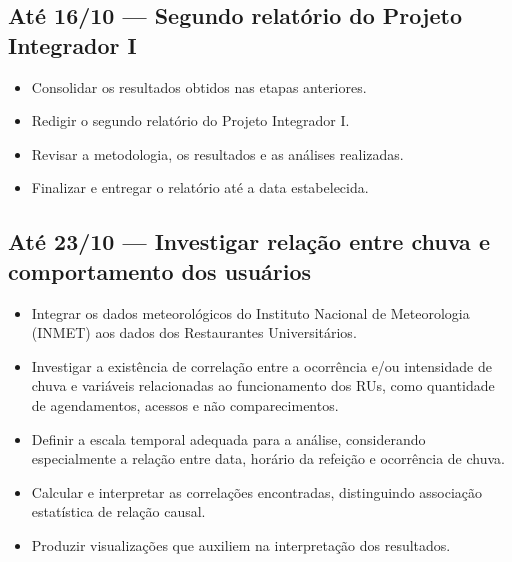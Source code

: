 \documentclass{article}
\begin{document}
\subsection{Até 16/10 --- Segundo relatório do Projeto Integrador I}
\label{ssec:etapa3}

\begin{itemize}
    \item Consolidar os resultados obtidos nas etapas anteriores.
    \item Redigir o segundo relatório do Projeto Integrador I.
    \item Revisar a metodologia, os resultados e as análises realizadas.
    \item Finalizar e entregar o relatório até a data estabelecida.
\end{itemize}

\subsection{Até 23/10 --- Investigar relação entre chuva e comportamento dos usuários}
\label{ssec:etapa4}

\begin{itemize}
    \item Integrar os dados meteorológicos do Instituto Nacional de Meteorologia (INMET) aos dados dos Restaurantes Universitários.
    \item Investigar a existência de correlação entre a ocorrência e/ou intensidade de chuva e variáveis relacionadas ao funcionamento dos RUs, como quantidade de agendamentos, acessos e não comparecimentos.
    \item Definir a escala temporal adequada para a análise, considerando especialmente a relação entre data, horário da refeição e ocorrência de chuva.
    \item Calcular e interpretar as correlações encontradas, distinguindo associação estatística de relação causal.
    \item Produzir visualizações que auxiliem na interpretação dos resultados.
\end{itemize}
\end{document}
